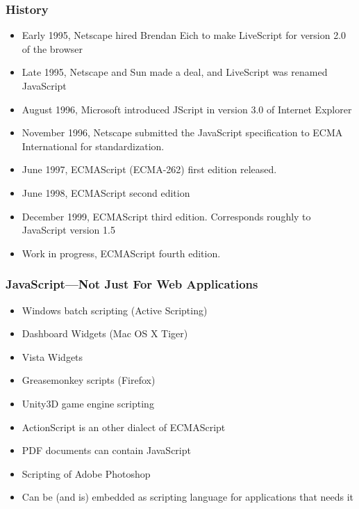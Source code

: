 \documentclass[dvipsnames]{beamer}
\begin{document}
\begin{frame} 
\frametitle{History}

\begin{itemize}
\item Early 1995, Netscape hired Brendan Eich to make LiveScript for
  version 2.0 of the browser
\item Late 1995, Netscape and Sun made a deal, and LiveScript was
  renamed JavaScript
\item August 1996, Microsoft introduced JScript in version 3.0 of Internet
  Explorer
\item November 1996, Netscape submitted the JavaScript specification
  to ECMA International for standardization.
\item June 1997, ECMAScript (ECMA-262) first edition released.
\item June 1998, ECMAScript second edition
\item December 1999, ECMAScript third edition.  Corresponds roughly
  to JavaScript version 1.5
\item Work in progress, ECMAScript fourth edition.
\end{itemize}
  
\end{frame}


\begin{frame} 
\frametitle{JavaScript---Not Just For Web Applications}

\begin{itemize}
\item Windows batch scripting (Active Scripting)
\item Dashboard Widgets (Mac OS X Tiger)
\item Vista Widgets
\item Greasemonkey scripts (Firefox)
\item Unity3D game engine scripting
\item ActionScript is an other dialect of ECMAScript
\item PDF documents can contain JavaScript
\item Scripting of Adobe Photoshop
\item Can be (and is) embedded as scripting language for applications
  that needs it
\end{itemize}
  
\end{frame}
\end{document}

